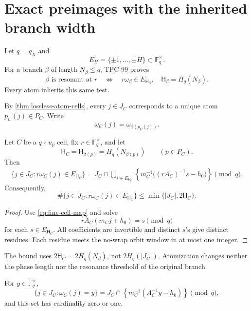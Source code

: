 \section{Exact preimages with the inherited branch width}
\label{sec:preimages}

Let \(q=q_X\) and
\[
 E_H=\{\pm1,\ldots,\pm H\}
 \subset\mathbb F_q^\times.
\]
For a branch \(\beta\) of length \(N_\beta\le q\), TPC-99 proves
\[
 \beta\text{ is resonant at }r
 \quad\Longleftrightarrow\quad
 r\omega_\beta\in E_{\mathsf H_\beta},
\quad
 \mathsf H_\beta=H_q(N_\beta).
\]
Every atom inherits this same test.

By \cref{thm:lossless-atom-cells}, every \(j\in J_C\) corresponds to
a unique atom \(p_C(j)\in P_C\).  Write
\[
 \omega_C(j)=\omega_{\beta(p_C(j))}.
\]

\begin{theorem}
\label{thm:correct-resonance-preimage}
Let \(C\) be a \(q\nmid u_p\) cell, fix
\(r\in\mathbb F_q^\times\), and let
\[
 \mathsf H_C=\mathsf H_{\beta(p)}=H_q(N_{\beta(p)})
 \qquad(p\in P_C).
\]
Then
\begin{align}
 \{j\in J_C:r\omega_C(j)\in E_{\mathsf H_C}\}
 =
 J_C\cap
 \bigcup_{s\in E_{\mathsf H_C}}
 \left\{
 m_C^{-1}\big((rA_C)^{-1}s-h_0\big)
 \right\}
 \pmod q.
\label{eq:correct-resonance-preimage}
\end{align}
Consequently,
\begin{equation}
 \#\{j\in J_C:r\omega_C(j)\in E_{\mathsf H_C}\}
 \le\min\{|J_C|,2\mathsf H_C\}.
\label{eq:correct-resonance-count}
\end{equation}
\end{theorem}

\begin{proof}
Use \eqref{eq:fine-cell-map} and solve
\[
 rA_C(m_Cj+h_0)=s\pmod q
\]
for each \(s\in E_{\mathsf H_C}\).  All coefficients are invertible and
distinct \(s\)'s give distinct residues.  Each residue meets the
no-wrap orbit window in at most one integer.
\end{proof}

\begin{remark}
The bound uses \(2\mathsf H_C=2H_q(N_\beta)\), not
\(2H_q(|J_C|)\).  Atomization changes neither the phase length nor
the resonance threshold of the original branch.
\end{remark}

\begin{corollary}
\label{cor:correct-multiplier-preimage}
For \(y\in\mathbb F_q^\times\),
\begin{equation}
 \{j\in J_C:\omega_C(j)=y\}
 =
 J_C\cap
 \left\{
 m_C^{-1}(A_C^{-1}y-h_0)
 \right\}
 \pmod q,
\label{eq:correct-multiplier-preimage}
\end{equation}
and this set has cardinality zero or one.
\end{corollary}

